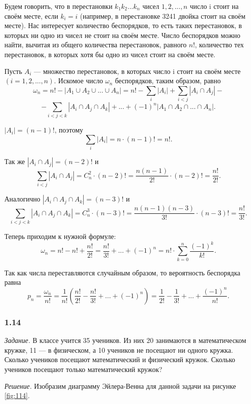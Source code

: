 \documentclass{book}
\begin{document}
Будем говорить, что в перестановки $k_1k_2...k_n$ чисел $1, 2, ..., n$ число i стоит на своём месте, если $k_i=i$ (например, в перестановке 3241 двойка стоит на своём месте). Нас интересует количество беспорядков, то есть таких перестановок, в которых ни одно из чисел не стоит на своём месте. Число беспорядков можно найти, вычитая из общего количества перестановок, равного $n!$, количество тех перестановок, в которых хотя бы одно из чисел стоит на своём месте.

Пусть $A_i$ --- множество перестановок, в которых число i стоит на своём месте $\left(i=1, 2, ..., n\right)$. Искомое число $\omega_n$ беспорядков, таким образом, равно $$\omega_n=n!-|A_1\cup A_2\cup...\cup A_n|=n!-\sum\limits_i|A_i|+\sum\limits_{i<j}|A_i\cap A_j|-$$$$-\sum\limits_{i<j<k}|A_i\cap A_j\cap A_k|+...+\left(-1\right)^n|A_1\cap A_2\cap...\cap A_n|.$$

$|A_i|=\left(n-1\right)!$, поэтому $$\sum\limits_i|A_i|=n\cdot\left(n-1\right)!=n!.$$

Так же $|A_i\cap A_j|=\left(n-2\right)!$ и $$\sum\limits_{i<j}|A_i\cap A_j|=C_n^2\cdot\left(n-2\right)!=\frac{n\left(n-1\right)}{2!}\cdot\left(n-2\right)!=\frac{n!}{2!}.$$

Аналогично $|A_i\cap A_j\cap A_k|=\left(n-3\right)!$ и $$\sum\limits_{i<j<k}|A_i\cap A_j\cap A_k|=C_n^3\cdot\left(n-3\right)!=\frac{n\left(n-1\right)\left(n-3\right)}{3!}\cdot\left(n-3\right)!=\frac{n!}{3!}.$$

Теперь приходим к нужной формуле: $$\omega_n=n!-n!+\frac{n!}{2!}=\frac{n!}{3!}+...+\left(-1\right)^n=n!\cdot\sum\limits_{k=0}^n\frac{\left(-1\right)^k}{k!}.$$

Так как числа переставляются случайным образом, то вероятность беспорядка равна $$p_n=\frac{\omega_n}{n!}=\frac{1}{n!}\left(\frac{n!}{2!}-\frac{n!}{3!}+...+\left(-1\right)^n\right)=\frac{1}{2!}-\frac{1}{3!}+...+\frac{\left(-1\right)^n}{n!}.$$

\subsubsection*{1.14}

\textit{Задание.} В классе учится 35 учеников. Из них 20 занимаются в математическом кружке, 11 --- в физическом, а 10 учеников не посещают ни одного кружка. Сколько учеников посещают математический и физический кружок. Сколько учеников посещают только математический кружок?

\textit{Решение.} Изобразим диаграмму Эйлера-Венна для данной задачи на рисунке \ref{fig:114}. 
\end{document}
